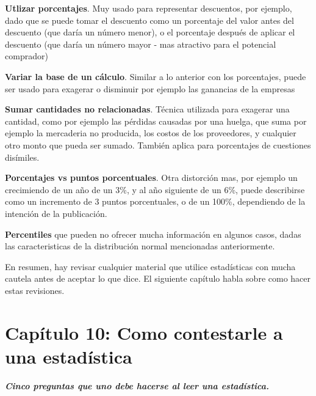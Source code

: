 \documentclass[letterpaper, 11pt]{article}
\begin{document}
\textbf{Utlizar porcentajes}. Muy usado para representar descuentos, por ejemplo, dado que se puede tomar el descuento como un porcentaje del valor antes del descuento (que daría un número menor), o el porcentaje después de aplicar el descuento (que daría un número mayor - mas atractivo para el potencial comprador)

\textbf{Variar la base de un cálculo}. Similar a lo anterior con los porcentajes, puede ser usado para exagerar o disminuir por ejemplo las ganancias de la empresas

\textbf{Sumar cantidades no relacionadas}. Técnica utilizada para exagerar una cantidad, como por ejemplo las pérdidas causadas por una huelga, que suma por ejemplo la mercaderia no producida, los costos de los proveedores, y cualquier otro monto que pueda ser sumado. También aplica para porcentajes de cuestiones disímiles.

\textbf{Porcentajes vs puntos porcentuales}. Otra distorción mas, por ejemplo un crecimiendo de un año de un 3\%, y al año siguiente de un 6\%, puede describirse como un incremento de 3 puntos porcentuales, o de un 100\%, dependiendo de la intención de la publicación.

\textbf{Percentiles} que pueden no ofrecer mucha información en algunos casos, dadas las caracteristicas de la distribución normal mencionadas anteriormente.

En resumen, hay revisar cualquier material que utilice estadísticas con mucha cautela antes de aceptar lo que dice. El siguiente capítulo habla sobre como hacer estas revisiones.


\section*{Capítulo 10: Como contestarle a una estadística}

\textbf{\textit{Cinco preguntas que uno debe hacerse al leer una estadística.}}
\end{document}

